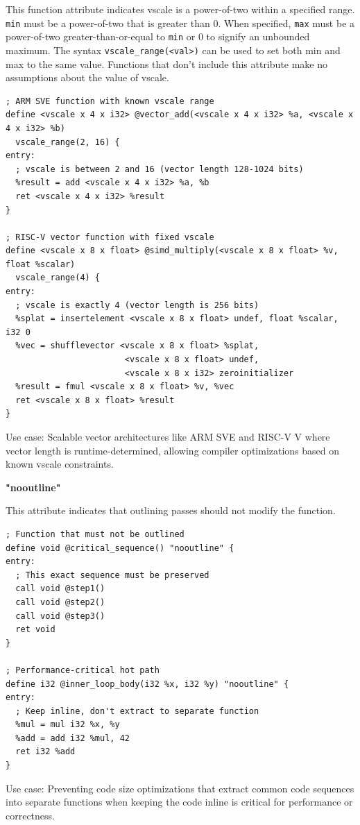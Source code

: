 This function attribute indicates vscale is a power-of-two within a specified range.
\texttt{min} must be a power-of-two that is greater than 0.
When specified, \texttt{max} must be a power-of-two greater-than-or-equal to \texttt{min} or 0 to signify an unbounded maximum.
The syntax \texttt{vscale\_range(<val>)} can be used to set both min and max to the same value.
Functions that don't include this attribute make no assumptions about the value of vscale.

\begin{lstlisting}[style=ir]
; ARM SVE function with known vscale range
define <vscale x 4 x i32> @vector_add(<vscale x 4 x i32> %a, <vscale x 4 x i32> %b)
  vscale_range(2, 16) {
entry:
  ; vscale is between 2 and 16 (vector length 128-1024 bits)
  %result = add <vscale x 4 x i32> %a, %b
  ret <vscale x 4 x i32> %result
}

; RISC-V vector function with fixed vscale
define <vscale x 8 x float> @simd_multiply(<vscale x 8 x float> %v, float %scalar)
  vscale_range(4) {
entry:
  ; vscale is exactly 4 (vector length is 256 bits)
  %splat = insertelement <vscale x 8 x float> undef, float %scalar, i32 0
  %vec = shufflevector <vscale x 8 x float> %splat,
                        <vscale x 8 x float> undef,
                        <vscale x 8 x i32> zeroinitializer
  %result = fmul <vscale x 8 x float> %v, %vec
  ret <vscale x 8 x float> %result
}
\end{lstlisting}

Use case: Scalable vector architectures like ARM SVE and RISC-V V where vector length is runtime-determined, allowing compiler optimizations based on known vscale constraints.

\textbf{"nooutline"}

This attribute indicates that outlining passes should not modify the function.

\begin{lstlisting}[style=ir]
; Function that must not be outlined
define void @critical_sequence() "nooutline" {
entry:
  ; This exact sequence must be preserved
  call void @step1()
  call void @step2()
  call void @step3()
  ret void
}

; Performance-critical hot path
define i32 @inner_loop_body(i32 %x, i32 %y) "nooutline" {
entry:
  ; Keep inline, don't extract to separate function
  %mul = mul i32 %x, %y
  %add = add i32 %mul, 42
  ret i32 %add
}
\end{lstlisting}

Use case: Preventing code size optimizations that extract common code sequences into separate functions when keeping the code inline is critical for performance or correctness.

